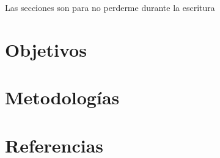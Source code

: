 \documentclass[12pt,letterpaper]{article}
\begin{document}
\maketitle
%
\tableofcontents
\pagebreak
Las secciones son para no perderme durante la escritura




\section {Objetivos}\label{sec:objetivos}
\section {Metodologías}\label{sec:metod}
\section {Referencias}\label{sec:refs}
\printbibliography[heading=none]
\end{document}
